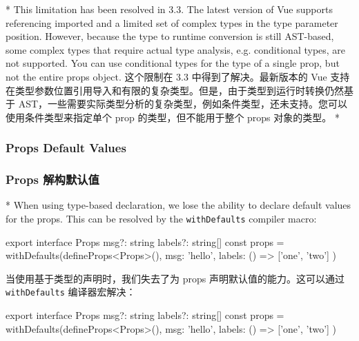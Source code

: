 \begin{paracol}{2} 
 
\switchcolumn[0]*%
This limitation has been resolved in 3.3. The latest version of Vue
supports referencing imported and a limited set of complex types in the
type parameter position. However, because the type to runtime conversion
is still AST-based, some complex types that require actual type
analysis, e.g. conditional types, are not supported. You can use
conditional types for the type of a single prop, but not the entire
props object.
\switchcolumn
这个限制在 3.3 中得到了解决。最新版本的 Vue
支持在类型参数位置引用导入和有限的复杂类型。但是，由于类型到运行时转换仍然基于
AST，一些需要实际类型分析的复杂类型，例如条件类型，还未支持。您可以使用条件类型来指定单个
prop 的类型，但不能用于整个 props 对象的类型。
\switchcolumn[0]*%
\subsubsection{Props Default Values}
\switchcolumn
\subsubsection{Props 解构默认值}
\switchcolumn[0]*%
When using type-based declaration, we lose the ability to declare
default values for the props. This can be resolved by the
\texttt{withDefaults} compiler macro:
\begin{codeTs}
export interface Props {
  msg?: string
  labels?: string[]
}
const props = withDefaults(defineProps<Props>(), {
  msg: 'hello',
  labels: () => ['one', 'two'] 
})
\end{codeTs}
\switchcolumn
当使用基于类型的声明时，我们失去了为 props 声明默认值的能力。这可以通过
\texttt{withDefaults} 编译器宏解决：
\begin{codeTs}
    export interface Props {
      msg?: string
      labels?: string[]
    }
    const props = withDefaults(defineProps<Props>(), {
      msg: 'hello',
      labels: () => ['one', 'two']
    })
    \end{codeTs}
\end{paracol}


